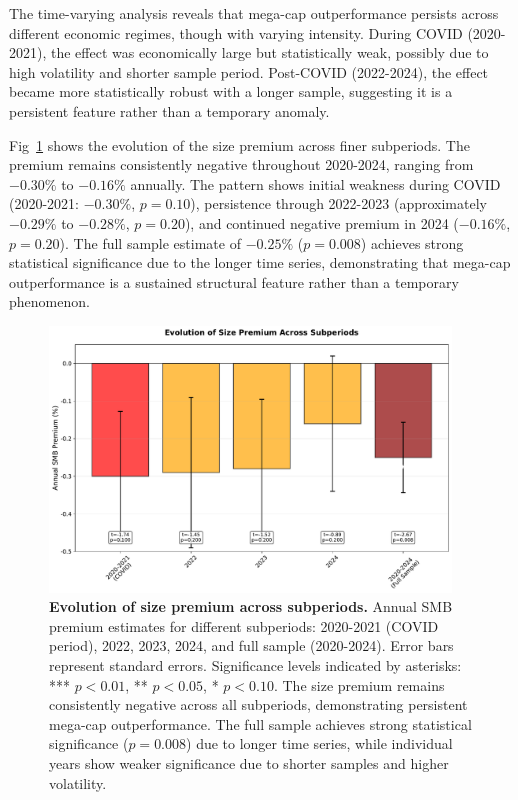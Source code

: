 \documentclass[10pt,letterpaper]{article}
\begin{document}
The time-varying analysis reveals that mega-cap outperformance persists across different economic regimes, though with varying intensity. During COVID (2020-2021), the effect was economically large but statistically weak, possibly due to high volatility and shorter sample period. Post-COVID (2022-2024), the effect became more statistically robust with a longer sample, suggesting it is a persistent feature rather than a temporary anomaly.

Fig~\ref{fig:annual_evolution} shows the evolution of the size premium across finer subperiods. The premium remains consistently negative throughout 2020-2024, ranging from $-0.30\%$ to $-0.16\%$ annually. The pattern shows initial weakness during COVID (2020-2021: $-0.30\%$, $p=0.10$), persistence through 2022-2023 (approximately $-0.29\%$ to $-0.28\%$, $p=0.20$), and continued negative premium in 2024 ($-0.16\%$, $p=0.20$). The full sample estimate of $-0.25\%$ ($p=0.008$) achieves strong statistical significance due to the longer time series, demonstrating that mega-cap outperformance is a sustained structural feature rather than a temporary phenomenon.

\begin{figure}[!h]
\centering
\includegraphics[width=0.95\textwidth]{figures/fig7_annual_smb_evolution.pdf}
\caption{\textbf{Evolution of size premium across subperiods.}
Annual SMB premium estimates for different subperiods: 2020-2021 (COVID period), 2022, 2023, 2024, and full sample (2020-2024). Error bars represent standard errors. Significance levels indicated by asterisks: *** $p<0.01$, ** $p<0.05$, * $p<0.10$. The size premium remains consistently negative across all subperiods, demonstrating persistent mega-cap outperformance. The full sample achieves strong statistical significance ($p=0.008$) due to longer time series, while individual years show weaker significance due to shorter samples and higher volatility.}
\label{fig:annual_evolution}
\end{figure}
\end{document}
